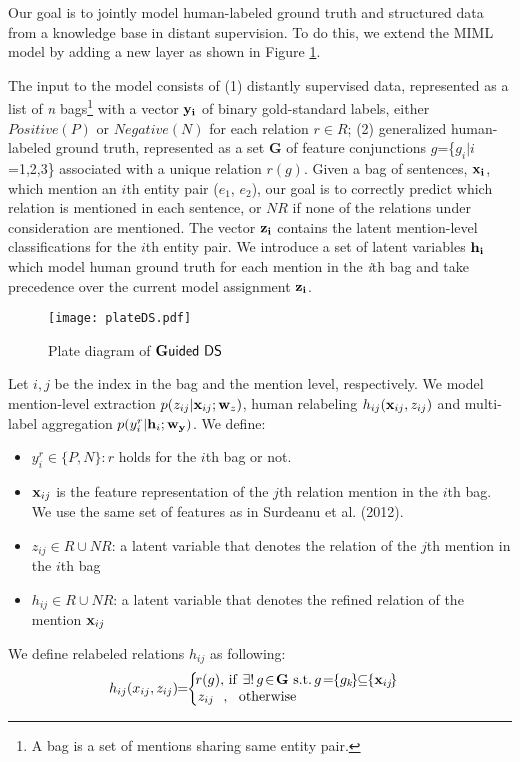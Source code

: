 \documentclass[11pt]{article}
\begin{document}
Our goal is to jointly model human-labeled ground truth and structured data from a knowledge base in distant supervision. To do this, we extend the MIML model \cite{surdeanu12} by adding a new layer as shown in Figure \ref{gds}.

The input to the model consists of (1) distantly supervised data, represented as a list of {\it n} bags\footnote{A bag is a set of mentions sharing same entity pair.} 
 with a vector ${\bf y_i} $ of binary gold-standard  labels, 
either $Positive (P)$ or $Negative (N)$  for each relation $r\!\!\in\!\!R$; (2) generalized human-labeled ground truth, represented as a set {\bf G}
of feature conjunctions  $g$=\{$g_i| i $=1,2,3\} associated with a unique relation $r(g)$.
Given a bag of sentences, ${\bf x_i} $, which mention an $i$th entity pair ($e_1$,\! $e_2$), 
our goal is to correctly predict which relation is mentioned in each sentence, or $N\!R$ if none of the relations under consideration are mentioned.
The vector ${\bf z_i} $ contains the latent mention-level classifications for the $i$th entity pair. 
 We introduce a set of latent variables ${\bf h_i} $ which model human ground truth for each mention in the {\it i}th bag 
  and take precedence over the current model assignment ${\bf z_i}$.
 
 \begin{figure}[h!]
 \captionsetup{belowskip=-8pt,aboveskip=3pt}
\centerline{\texttt{[image: plateDS.pdf]}}
\caption{Plate diagram of $\mathsf{{\bf G}uided\ DS}$ }
\label{gds}
\end{figure}

   Let $i, j$ be the index in the bag and the mention level, respectively.
 We model mention-level extraction $p(z_{ij}| {\bf x}_{ij}; {\bf w}_z)$, 
 human relabeling $h_{ij}({\bf x}_{ij}, z_{ij})$ and multi-label aggregation $p(y_i^r | {\bf h}_i; {\bf w_y})$.
 We define:
 
 \vspace{-2mm}
 \begin{itemize}[leftmargin=*]\itemsep -0.2em 
  \item $y_i^r\!\in\! \{P,N\}: r$ holds for the $i$th bag or not.
  \item ${\bf x}_{ij}$ is the feature representation of the $j$th relation mention in the $i$th bag. We use the same set of features as in Surdeanu et al. (2012).
 \item $z_{ij}\!\!\in\!\! R\cup N\!R$: a latent variable that denotes the relation of the $j$th mention in the $i$th bag \item $h_{ij}\!\in\! R\cup N\!R$: a latent variable that denotes the refined relation of the mention ${\bf x}_{ij}$
 \end{itemize}
 We define relabeled relations $h_{ij}$ as following:
 \vspace{1mm}
 $$h_{ij} (x_{ij}, z_{ij})\!\!=\!\! 
 \left\{ \begin{array}{l}
\!\!\!\!r(g),\!\ {\rm if\ } \exists!\ \! g\!\in\!{\bf G} {\rm\ s.t.\ } \!g\!=\!\!\{g_k\!\}\!\!\subseteq\!\!  \{{\bf x}_{ij}\!\} \   \\ 
\!\!\!z_{ij}\ \ , {\rm\ \ otherwise}
\end{array}\right.$$
 \vspace{-2mm}
\end{document}
